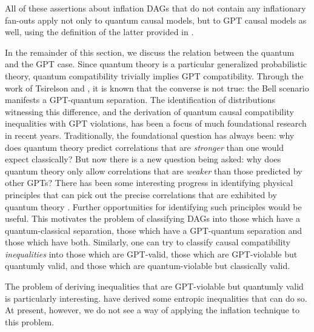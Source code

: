 \documentclass[aps,english,10pt,superscriptaddress,onecolumn,twoside,longbibliography,pra,floatfix,fleqn,nofootinbib]{revtex4-1}%
\theoremstyle{definition}
\begin{document}
All of these assertions about inflation DAGs that do not contain any inflationary fan-outs apply not only to quantum causal models, but to GPT causal models as well, using the definition of the latter provided in \cite{pusey2014gdag}.  


In the remainder of this section, we discuss the relation between the quantum and the GPT case. Since quantum theory is a particular generalized probabilistic theory, quantum compatibility trivially implies GPT compatibility. Through the work of Tsirelson \cite{Tsirelson1980} and \citet{PROriginal}, it is known that the converse is not true: the Bell scenario manifests a GPT-quantum separation.  The identification of distributions witnessing this difference, and the derivation of quantum causal compatibility inequalities with GPT violations, has been a focus of much foundational research in recent years. Traditionally, the foundational question has always been: why does quantum theory predict correlations that are {\em stronger} than one would expect classically?  But now there is a new question being asked: why does quantum theory only allow correlations that are {\em weaker} than those predicted by other GPTs?  There has been some interesting progress in identifying physical principles that can pick out the precise correlations that are exhibited by quantum theory \cite{PopescuReviewNatureComm,ScaraniML,Rohrlich2014,InfoCausArXiv,LONatureComm,LOExploring,EPNBody,barnum2014interference,AlmostQuantum}.  Further opportunities for identifying such principles would be useful.  This motivates the problem of classifying DAGs into those which have a quantum-classical separation, those which have a GPT-quantum separation and those which have both. Similarly, one can try to classify causal compatibility \emph{inequalities} into those which are GPT-valid, those which are GPT-violable but quantumly valid, and those which are quantum-violable but classically valid. 

The problem of deriving inequalities that are GPT-violable but quantumly valid is particularly interesting.  
\citet{Chaves2015infoquantum} have derived some entropic inequalities that can do so.  At present, however, we do not see a way of applying the inflation technique to this problem. 
\end{document}
